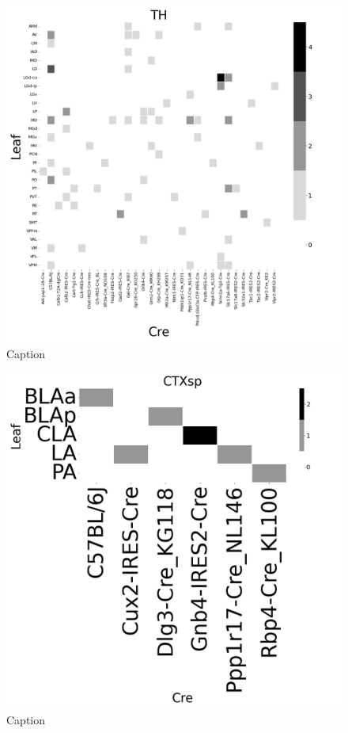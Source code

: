 \begin{figure}[H]
    \centering
    \includegraphics[width = 7in]{figs/TH centroid density.png}
    \caption{Caption}
    \label{fig:my_label}
\end{figure}
\newpage

\begin{figure}[H]
    \centering
    \includegraphics[width = 7in]{figs/CTXsp centroid density.png}
    \caption{Caption}
    \label{fig:my_label}
\end{figure}
\newpage

